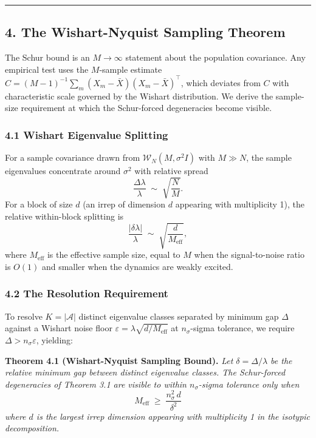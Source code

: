 \documentclass[
  11pt,
]{article}
\begin{document}
\begin{center}\rule{0.5\linewidth}{0.5pt}\end{center}

\subsection{4. The Wishart-Nyquist Sampling
Theorem}\label{the-wishart-nyquist-sampling-theorem}

The Schur bound is an \(M \to \infty\) statement about the population
covariance. Any empirical test uses the \(M\)-sample estimate
\(\hat C = (M-1)^{-1} \sum_m (X_m - \bar X)(X_m - \bar X)^\top\), which
deviates from \(C\) with characteristic scale governed by the Wishart
distribution. We derive the sample-size requirement at which the
Schur-forced degeneracies become visible.

\subsubsection{4.1 Wishart Eigenvalue
Splitting}\label{wishart-eigenvalue-splitting}

For a sample covariance drawn from \(\mathcal{W}_N(M, \sigma^2 I)\) with
\(M \gg N\), the sample eigenvalues concentrate around \(\sigma^2\) with
relative spread
\[\frac{\Delta\lambda}{\lambda} \;\sim\; \sqrt{\frac{N}{M}}. \tag{4.1}\]
For a block of size \(d\) (an irrep of dimension \(d\) appearing with
multiplicity 1), the relative within-block splitting is
\[\frac{|\delta\lambda|}{\lambda} \;\sim\; \sqrt{\frac{d}{M_\text{eff}}}, \tag{4.2}\]
where \(M_\text{eff}\) is the effective sample size, equal to \(M\) when
the signal-to-noise ratio is \(O(1)\) and smaller when the dynamics are
weakly excited.

\subsubsection{4.2 The Resolution
Requirement}\label{the-resolution-requirement}

To resolve \(K = |\mathcal{A}|\) distinct eigenvalue classes separated
by minimum gap \(\Delta\) against a Wishart noise floor
\(\varepsilon = \lambda \sqrt{d / M_\text{eff}}\) at \(n_\sigma\)-sigma
tolerance, we require \(\Delta > n_\sigma \varepsilon\), yielding:

\textbf{Theorem 4.1 (Wishart-Nyquist Sampling Bound).} \emph{Let
\(\delta = \Delta/\lambda\) be the relative minimum gap between distinct
eigenvalue classes. The Schur-forced degeneracies of Theorem 3.1 are
visible to within \(n_\sigma\)-sigma tolerance only when}
\[\boxed{\;M_\text{eff} \;\geq\; \frac{n_\sigma^2 \, d}{\delta^2}\;} \tag{4.3}\]
\emph{where \(d\) is the largest irrep dimension appearing with
multiplicity 1 in the isotypic decomposition.}
\end{document}
